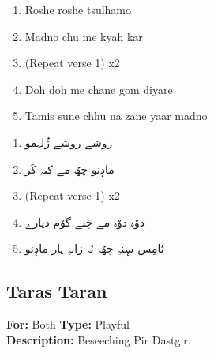 \documentclass[12pt]{article}
\newcommand{\bigroman}[1]{\fontsize{16pt}{18pt}\selectfont\RaggedRight #1}
\newcommand{\bigarabic}[1]{\fontsize{16pt}{18pt}\selectfont \textarabic{#1}}
\begin{document}
      \begin{multicols}{2}
        \begin{enumerate}[leftmargin=*, label=\arabic*., font=\fontsize{16pt}{18pt}\selectfont]
          \item \bigroman{Roshe roshe tsulhamo}
          \item \bigroman{Madno chu me kyah kar}
          \item \bigroman{(Repeat verse 1) x2}
          \item \bigroman{Doh doh me chane gom diyare}
          \item \bigroman{Tamis sune chhu na zane yaar madno}
        \end{enumerate}
        
        \columnbreak
        
        \begin{RTL}
        \begin{enumerate}[leftmargin=*, label=\arabic*., font=\fontsize{16pt}{18pt}\selectfont]
          \item \bigarabic{روشے روشے ژُلہمو}
          \item \bigarabic{مادٕنو چھُ مے کیہ کَر}
          \item \bigarabic{(Repeat verse 1) x2}
          \item \bigarabic{دۆہ دۆہ مے چَنے گۆم دیارے}
          \item \bigarabic{تٔامِس سٕنہِ چھُہ نٔہ زانہِ یار مادٕنو}
        \end{enumerate}
        \end{RTL}
        \end{multicols}





        \subsection*{Taras Taran}
        \textbf{For:} Both \quad \textbf{Type:} Playful\\
        \textbf{Description:} Beseeching Pir Dastgir.
        
\end{document}
